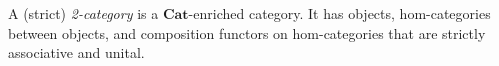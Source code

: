 A (strict) \emph{2-category} is a $\mathbf{Cat}$-enriched category. It has objects, hom-categories between objects, and composition functors on hom-categories that are strictly associative and unital.
